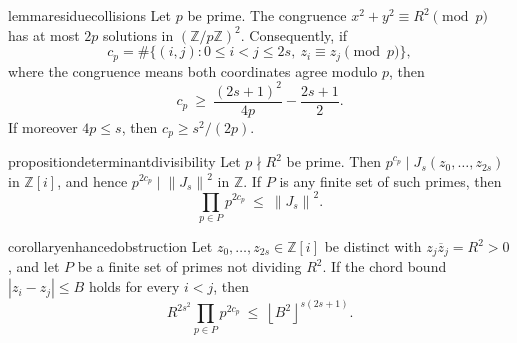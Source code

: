 \documentclass[11pt]{article}
\newcommand{\Z}{\mathbb Z}
\newcommand{\GI}{\mathbb Z[i]}
\newcommand{\Norm}[1]{\left\lVert#1\right\rVert^2}
\newcommand{\floor}[1]{\left\lfloor #1 \right\rfloor}
\newcommand{\conj}[1]{\overline{#1}}
\begin{document}
\begin{restatable}{lemma}{residuecollisions}\label{lem:collision}
Let \(p\) be prime.
The congruence \(x^2+y^2\equiv R^2\pmod p\) has at most \(2p\) solutions in \((\Z/p\Z)^2\).
Consequently, if
\[
  c_p=\#\{(i,j):0\le i<j\le 2s,\ z_i\equiv z_j \pmod p\},
\]
where the congruence means both coordinates agree modulo \(p\), then
\[
  c_p\ \ge\ \frac{(2s+1)^2}{4p}-\frac{2s+1}{2}.
\]
If moreover \(4p\le s\), then \(c_p\ge s^2/(2p)\).
\end{restatable}

\begin{restatable}{proposition}{determinantdivisibility}\label{prop:divisibility}
Let \(p\nmid R^2\) be prime.
Then \(p^{c_p}\mid J_s(z_0,\ldots,z_{2s})\) in \(\GI\), and hence \(p^{2c_p}\mid\Norm{J_s}\) in \(\Z\).
If \(P\) is any finite set of such primes, then
\[
  \prod_{p\in P}p^{2c_p}\ \le\ \Norm{J_s}.
\]
\end{restatable}

\begin{restatable}{corollary}{enhancedobstruction}\label{cor:enhanced}
Let \(z_0,\dots,z_{2s}\in\GI\) be distinct with \(z_j\conj z_j=R^2>0\), and let \(P\) be a finite set of primes not dividing \(R^2\).
If the chord bound \(|z_i-z_j|\le B\) holds for every \(i<j\), then
\[
  R^{2s^2}\prod_{p\in P}p^{2c_p}\ \le\ \floor{B^2}^{s(2s+1)}.
\]
\end{restatable}
\end{document}
